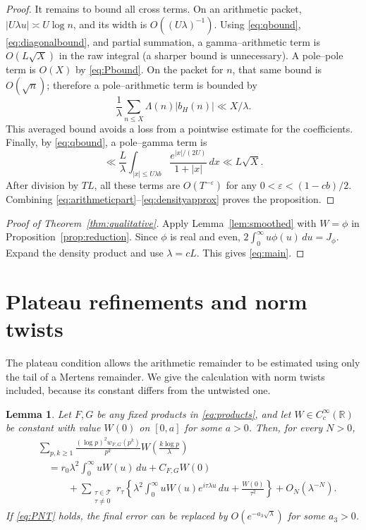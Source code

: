 \documentclass[11pt]{article}
\numberwithin{equation}{section}
\newtheorem{lemma}[theorem]{Lemma}
\theoremstyle{remark}
\newcommand{\R}{\mathbb R}
\begin{document}
\begin{proof}
It remains to bound all cross terms. On an arithmetic packet,
$|U\lambda u|\asymp U\log n$, and its width is $O((U\lambda)^{-1})$.
Using \eqref{eq:qbound}, \eqref{eq:diagonalbound}, and partial
summation, a gamma--arithmetic term is $O(L\sqrt X)$ in the raw
integral (a sharper bound is unnecessary). A pole--pole term is
$O(X)$ by \eqref{eq:Pbound}. On the packet for $n$, that same bound
is $O(\sqrt n)$; therefore a pole--arithmetic term is bounded by
\[
 \frac1\lambda\sum_{n\leq X}\Lambda(n)|b_H(n)|\ll X/\lambda.
\]
This averaged bound avoids a loss from a pointwise estimate for the
coefficients. Finally, by \eqref{eq:qbound}, a pole--gamma term is
\[
 \ll\frac L\lambda\int_{|x|\leq U\lambda b}
             \frac{e^{|x|/(2U)}}{1+|x|}\,dx
 \ll L\sqrt X.
\]
After division by $TL$, all these terms are
$O(T^{-\varepsilon})$ for any
$0<\varepsilon<(1-cb)/2$. Combining
\eqref{eq:arithmeticpart}--\eqref{eq:densityapprox} proves the
proposition.
\end{proof}

\begin{proof}[Proof of Theorem~\ref{thm:qualitative}]
Apply Lemma~\ref{lem:smoothed} with $W=\phi$ in
Proposition~\ref{prop:reduction}. Since $\phi$ is real and even,
$2\int_0^\infty u\phi(u)\,du=J_\phi$.
Expand the density product and use $\lambda=cL$. This gives
\eqref{eq:main}.
\end{proof}

\section{Plateau refinements and norm twists}

The plateau condition allows the arithmetic remainder to be estimated
using only the tail of a Mertens remainder. We give the calculation with
norm twists included, because its constant differs from the untwisted
one.

\begin{lemma}\label{lem:quantarith}
Let $F,G$ be any fixed products in \eqref{eq:products}, and let
$W\in C_c^\infty(\R)$ be constant with value $W(0)$ on $[0,a]$ for
some $a>0$. Then, for every $N>0$,
\begin{equation}\label{eq:quantsum}
\begin{split}
 &\sum_{p,k\geq1}\frac{(\log p)^2w_{F,G}(p^k)}{p^k}
                   W\!\left(\frac{k\log p}{\lambda}\right)\\
 &\quad=r_0\lambda^2\int_0^\infty uW(u)\,du+C_{F,G}W(0)\\
 &\qquad\quad+\sum_{\substack{\tau\in\mathcal T\\\tau\ne0}}
 r_\tau\left\{\lambda^2\int_0^\infty uW(u)e^{i\tau\lambda u}\,du
                       +\frac{W(0)}{\tau^2}\right\}
 +O_N(\lambda^{-N}).
\end{split}
\end{equation}
If \eqref{eq:PNT} holds, the final error can be replaced by
$O(e^{-a_3\sqrt\lambda})$ for some $a_3>0$.
\end{lemma}
\end{document}
